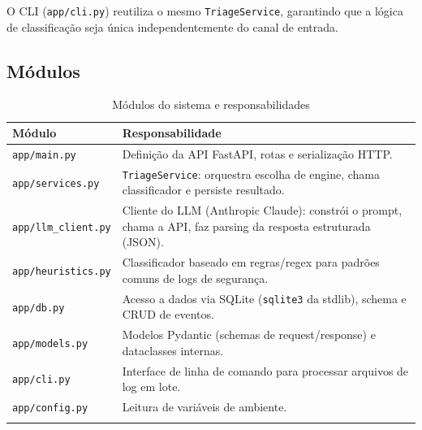 \documentclass[11pt,a4paper]{article}
\begin{document}
\begin{center}
\end{center}

O CLI (\texttt{app/cli.py}) reutiliza o mesmo \texttt{TriageService}, garantindo que a
lógica de classificação seja única independentemente do canal de entrada.

\subsection{Módulos}

\begin{longtable}{p{3.6cm}p{9.5cm}}
\toprule
\textbf{Módulo} & \textbf{Responsabilidade} \\
\midrule
\endhead
\texttt{app/main.py} & Definição da API FastAPI, rotas e serialização HTTP. \\
\texttt{app/services.py} & \texttt{TriageService}: orquestra escolha de engine, chama classificador e persiste resultado. \\
\texttt{app/llm\_client.py} & Cliente do LLM (Anthropic Claude): constrói o prompt, chama a API, faz parsing da resposta estruturada (JSON). \\
\texttt{app/heuristics.py} & Classificador baseado em regras/regex para padrões comuns de logs de segurança. \\
\texttt{app/db.py} & Acesso a dados via SQLite (\texttt{sqlite3} da stdlib), schema e CRUD de eventos. \\
\texttt{app/models.py} & Modelos Pydantic (schemas de request/response) e dataclasses internas. \\
\texttt{app/cli.py} & Interface de linha de comando para processar arquivos de log em lote. \\
\texttt{app/config.py} & Leitura de variáveis de ambiente. \\
\bottomrule
\caption{Módulos do sistema e responsabilidades}
\end{longtable}
\end{document}
